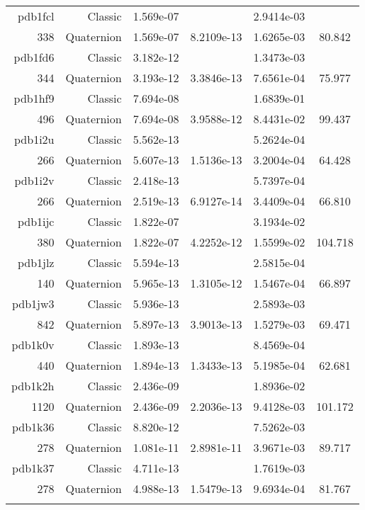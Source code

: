 \begin{xltabular}{\textwidth}{r|rS[table-format=1.3e+2]S[table-format=1.4e+2]S[table-format=1.4e+2]S[table-format=-1.3]}
pdb1fcl & Classic & 1.569e-07 &  & 2.9414e-03 & \\
338 & Quaternion & 1.569e-07 & 8.2109e-13 & 1.6265e-03 & 80.842\\  \addlinespace
pdb1fd6 & Classic & 3.182e-12 &  & 1.3473e-03 & \\
344 & Quaternion & 3.193e-12 & 3.3846e-13 & 7.6561e-04 & 75.977\\  \addlinespace
pdb1hf9 & Classic & 7.694e-08 &  & 1.6839e-01 & \\
496 & Quaternion & 7.694e-08 & 3.9588e-12 & 8.4431e-02 & 99.437\\  \addlinespace
pdb1i2u & Classic & 5.562e-13 &  & 5.2624e-04 & \\
266 & Quaternion & 5.607e-13 & 1.5136e-13 & 3.2004e-04 & 64.428\\  \addlinespace
pdb1i2v & Classic & 2.418e-13 &  & 5.7397e-04 & \\
266 & Quaternion & 2.519e-13 & 6.9127e-14 & 3.4409e-04 & 66.810\\  \addlinespace
pdb1ijc & Classic & 1.822e-07 &  & 3.1934e-02 & \\
380 & Quaternion & 1.822e-07 & 4.2252e-12 & 1.5599e-02 & 104.718\\  \addlinespace
pdb1jlz & Classic & 5.594e-13 &  & 2.5815e-04 & \\
140 & Quaternion & 5.965e-13 & 1.3105e-12 & 1.5467e-04 & 66.897\\  \addlinespace
pdb1jw3 & Classic & 5.936e-13 &  & 2.5893e-03 & \\
842 & Quaternion & 5.897e-13 & 3.9013e-13 & 1.5279e-03 & 69.471\\  \addlinespace
pdb1k0v & Classic & 1.893e-13 &  & 8.4569e-04 & \\
440 & Quaternion & 1.894e-13 & 1.3433e-13 & 5.1985e-04 & 62.681\\  \addlinespace
pdb1k2h & Classic & 2.436e-09 &  & 1.8936e-02 & \\
1120 & Quaternion & 2.436e-09 & 2.2036e-13 & 9.4128e-03 & 101.172\\  \addlinespace
pdb1k36 & Classic & 8.820e-12 &  & 7.5262e-03 & \\
278 & Quaternion & 1.081e-11 & 2.8981e-11 & 3.9671e-03 & 89.717\\  \addlinespace
pdb1k37 & Classic & 4.711e-13 &  & 1.7619e-03 & \\
278 & Quaternion & 4.988e-13 & 1.5479e-13 & 9.6934e-04 & 81.767\\  \addlinespace

\end{xltabular}
